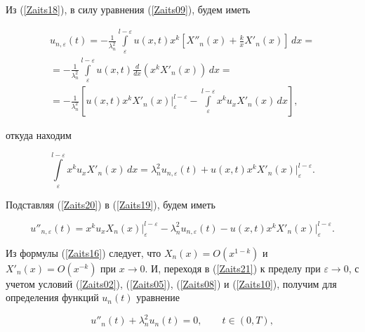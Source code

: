 Из (\ref{Zaits18}), в силу уравнения (\ref{Zaits09}), будем иметь

\begin{multline*}

u_{n,\varepsilon}(t)=-\frac{1}{\lambda_n^2}\int\limits_\varepsilon^{l-\varepsilon} u(x,t)x^k\left[X''_n(x)+\frac{k}{x}X'_n(x)\right]\,dx=\\

=-\frac{1}{\lambda_n^2}\int\limits_\varepsilon^{l-\varepsilon} u(x,t)\frac{d}{dx}\left(x^kX'_n(x)\right)\,dx=\\

=-\frac{1}{\lambda_n^2}\left[u(x,t)x^kX'_n(x)\Bigr|_\varepsilon^{l-\varepsilon}-\int\limits_\varepsilon^{l-\varepsilon}x^ku_xX'_n(x)\,dx\right],

\end{multline*}

откуда находим

\begin{equation}

\label{Zaits20}

\int\limits_\varepsilon^{l-\varepsilon}x^ku_xX'_n(x)\,dx=\lambda_n^2u_{n,\varepsilon}(t)+u(x,t)x^kX'_n(x)\Bigr|_\varepsilon^{l-\varepsilon}.

\end{equation}



Подставляя (\ref{Zaits20}) в (\ref{Zaits19}), будем иметь

\begin{equation}

\label{Zaits21}

u''_{n,\varepsilon}(t)=x^ku_xX_n(x)\Bigr|_\varepsilon^{l-\varepsilon}-\lambda_n^2u_{n,\varepsilon}(t)-u(x,t)x^kX'_n(x)\Bigr|_\varepsilon^{l-\varepsilon}.

\end{equation}

Из формулы (\ref{Zaits16}) следует, что $X_n(x)=O(x^{1-k})$ и $X'_n(x)=O(x^{-k})$ при $x\rightarrow 0$. И, переходя в (\ref{Zaits21}) к пределу при $\varepsilon\rightarrow0$, с учетом условий (\ref{Zaits02}), (\ref{Zaits05}), (\ref{Zaits08}) и (\ref{Zaits10}), получим для определения функций $u_n(t)$ уравнение

\begin{equation}

\label{Zaits22}

u''_n(t)+\lambda_n^2u_n(t)=0,\qquad t\in(0,T),

\end{equation}

